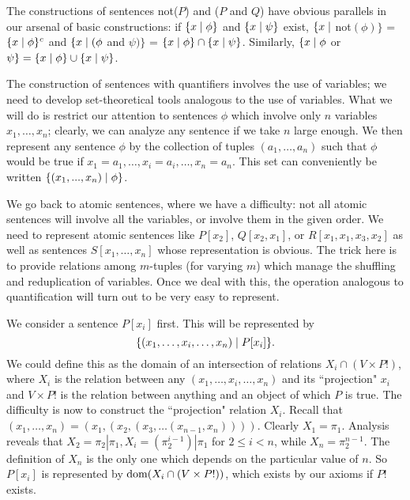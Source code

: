 The constructions of sentences not($P$) and ($P$ and $Q$) have
obvious parallels in our arsenal of basic constructions:  if $\{x \mid \phi\}$
and $\{x \mid \psi\}$ exist, \linebreak $\{x \mid$ not$(\phi)\}$ = $\{x \mid \phi\}^c$ and 
$\{x \mid (\phi$ and $\psi)\}$ =
$\{x \mid \phi\} \cap \{x \mid \psi\}$.  Similarly, $\{x \mid \phi$ or $\psi\} =
\{x \mid \phi\} \cup \{x \mid \psi\}$.

The construction of sentences with quantifiers involves the
use of variables; we need to develop set-theoretical tools analogous
to the use of variables.  What we will do is restrict our attention to
sentences $\phi$ which involve only $n$ variables $x_1,\ldots,x_n$; clearly, we
can analyze any sentence if we take $n$ large enough.  We then represent any
sentence $\phi$ by the collection of tuples $(a_1,\ldots,a_n)$ such that $\phi$
would be true if $x_1 = a_1,\ldots,x_i = a_i,\ldots,x_n = a_n$.  This set can
conveniently be written $\{(x_1,...,x_n) \mid \phi\}$.

We go back to atomic sentences, where we have a difficulty:
not all atomic sentences will involve all the variables, or involve
them in the given order.  We need to represent atomic sentences like
$P[x_2]$, $Q[x_2,x_1]$, or $R[x_1,x_1,x_3,x_2]$ as well as sentences
$S[x_1,\ldots,x_n]$ whose representation is obvious.  The trick here is
to provide relations among $m$-tuples (for varying $m$) which
manage the shuffling and reduplication of variables.  Once we deal with this,
the operation analogous to quantification will turn out to be very easy to
represent.

We consider a sentence $P[x_i]$ first.  This will be
represented by
$$
 \{(x_1,\ldots,x_i,\ldots,x_n) \mid P[x_i]\}.
$$
We could define this as the domain of an
intersection of relations 
$X_i \cap (V\times P!)$, where $X_i$ is the relation between any
$(x_1,\ldots,x_i,\ldots,x_n)$ and its ``projection" $x_i$ and $V
\times P!$ is the relation between anything and an object of which $P$ is true.
The difficulty is now to construct the ``projection" relation
$X_i$. Recall that $(x_1,\ldots,x_n) =
(x_1,(x_2,(x_3,\ldots(x_{n-1},x_n))))$.  Clearly $X_1 = \pi_1$.
Analysis reveals that $X_2 = \pi_2|\pi_1, X_i = (\pi_2^{i-1})|\pi_1$
for $2 \leq i < n$, while $X_n = \pi_2^{n-1}$.  The definition of
$X_n$ is the only one which depends on the particular value of $n$.
So $P[x_i]$ is represented by $\mathop{\mathrm{dom}}(X_i
\cap (V \times P!))$, which exists by our axioms if $P!$ exists.

